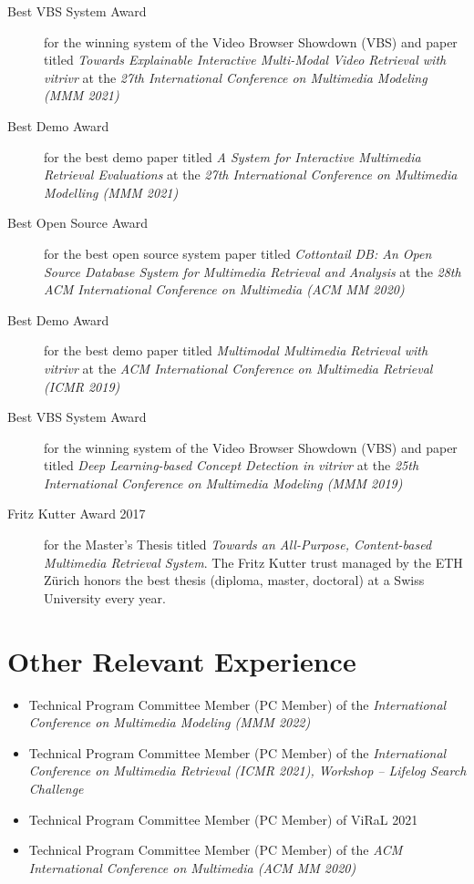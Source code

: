 \begin{description}
	\item [Best VBS System Award] for the winning system of the Video Browser Showdown (VBS) and paper titled \emph{Towards Explainable Interactive Multi-Modal Video Retrieval with vitrivr} at the \emph{27th International Conference on Multimedia Modeling (MMM 2021)}
	\item [Best Demo Award] for the best demo paper titled \emph{A System for Interactive Multimedia Retrieval Evaluations} at the \emph{27th International Conference on Multimedia Modelling (MMM 2021)}
	\item [Best Open Source Award] for the best open source system paper titled \emph{Cottontail DB: An Open Source Database System for Multimedia Retrieval and Analysis} at the \emph{28th ACM International Conference on Multimedia (ACM MM 2020)}
	\item [Best Demo Award] for the best demo paper titled \emph{Multimodal Multimedia Retrieval with vitrivr} at the \emph{ACM International Conference on Multimedia Retrieval (ICMR 2019)}
	\item [Best VBS System Award] for the winning system of the Video Browser Showdown (VBS) and paper titled \emph{Deep Learning-based Concept Detection in vitrivr} at the \emph{25th International Conference on Multimedia Modeling (MMM 2019)}
	\item [Fritz Kutter Award 2017] for the Master's Thesis titled \emph{Towards an All-Purpose, Content-based Multimedia Retrieval System}. The Fritz Kutter trust managed by the ETH Zürich honors the best thesis (diploma, master, doctoral) at a Swiss University every year.
\end{description}

\section*{Other Relevant Experience}

\begin{itemize}
	\item Technical Program Committee Member (PC Member) of the \emph{International Conference on Multimedia Modeling (MMM 2022)} 
	\item Technical Program Committee Member (PC Member) of the \emph{International Conference on Multimedia Retrieval (ICMR 2021), Workshop -- Lifelog Search Challenge} 
	\item Technical Program Committee Member (PC Member) of ViRaL 2021 
	\item Technical Program Committee Member (PC Member) of the \emph{ACM International Conference on Multimedia (ACM MM 2020)} 
\end{itemize}

\cleardoublepage
